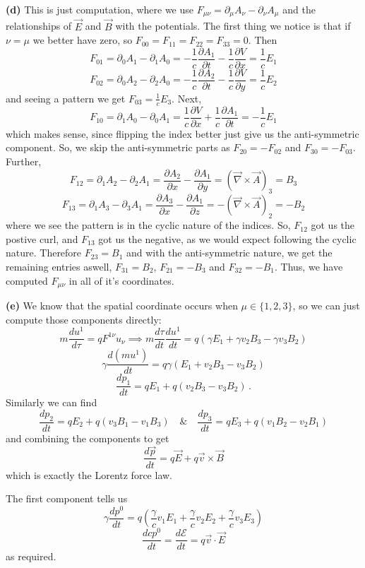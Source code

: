 \documentclass[10pt]{article}
\newcommand{\di}[2][]{\frac{\partial #1}{\partial #2}}
\newcommand{\del}[2][]{\frac{d #1}{d #2}}
\begin{document}
\textbf{(d)} This is just computation, where we use $F_{\mu\nu} =\partial_{\mu}A_{\nu} - \partial_{\nu}A_{\mu}$ and the relationships of $\vec{E}$ and $\vec{B}$ with the potentials. The first thing we notice is that if $\nu=\mu$ we better have zero, so $F_{00} = F_{11} = F_{22} = F_{33} = 0$. Then
\[ F_{01} = \partial_{0}A_{1} - \partial_{1}A_{0} = -\frac{1}{c}\di[A_{1}]{t} - \frac{1}{c}\di[V]{x} = \frac{1}{c}E_{1} \]
\[ F_{02} = \partial_{0}A_{2} - \partial_{2}A_{0} = -\frac{1}{c}\di[A_{2}]{t} - \frac{1}{c}\di[V]{y} = \frac{1}{c}E_{2} \]
and seeing a pattern we get $F_{03} = \frac{1}{c}E_{3}$. Next,
\[ F_{10} = \partial_{1}A_{0} - \partial_{0}A_{1} = \frac{1}{c}\di[V]{x} + \frac{1}{c}\di[A_{1}]{t} = -\frac{1}{c}E_{1}\]
which makes sense, since flipping the index better just give us the anti-symmetric component. So, we skip the anti-symmetric parts as $F_{20} = -F_{02}$ and $F_{30} = -F_{03}$. Further,
\[ F_{12} = \partial_{1}A_{2} - \partial_{2}A_{1} = \di[A_{2}]{x} - \di[A_{1}]{y} = \left(\vec{\nabla}\times \vec{A}\right)_{3} = B_{3}\]
\[ F_{13} = \partial_{1}A_{3} - \partial_{3}A_{1} = \di[A_{3}]{x} - \di[A_{1}]{z} = -\left(\vec{\nabla}\times \vec{A}\right)_{2} = -B_{2} \]
where we see the pattern is in the cyclic nature of the indices. So, $F_{12}$ got us the postive curl, and $F_{13}$ got us the negative, as we would expect following the cyclic nature. Therefore $F_{23} = B_{1}$ and with the anti-symmetric nature, we get the remaining entries aswell, $F_{31} = B_{2}$, $F_{21} = -B_{3}$ and $F_{32} = -B_{1}$. Thus, we have computed $F_{\mu\nu}$ in all of it's coordinates.

\textbf{(e)} We know that the spatial coordinate occurs when $\mu \in \{1,2,3\}$, so we can just compute those components directly:
\[ m\del[u^{1}]{\tau} = qF^{1\nu}u_{\nu} \implies m\del[\tau]{t}\del[u^{1}]{t} = q\left(\gamma E_{1} + \gamma v_{2}B_{3} - \gamma v_{3} B_{2}\right) \]
\[ \gamma\del[(mu^{1})]{t} = q\gamma\left(E_{1} + v_{2}B_{3} - v_{3}B_{2}\right) \]
\[ \del[p_{1}]{t} = qE_{1} + q(v_{2}B_{3} - v_{3}B_{2})\, .\]
Similarly we can find
\[ \del[p_{2}]{t} = qE_{2} + q(v_{3}B_{1} - v_{1}B_{3}) \quad \& \quad \del[p_{3}]{t} = qE_{3} + q(v_{1}B_{2} - v_{2}B_{1}) \]
and combining the components to get
\[ \del[\vec{p}]{t} = q\vec{E} + q\vec{v}\times \vec{B} \]
which is exactly the Lorentz force law.

The first component tells us
\[ \gamma \del[p^{0}]{t} = q\left(\frac{\gamma}{c}v_{1}E_{1} + \frac{\gamma}{c}v_{2}E_{2} + \frac{\gamma}{c}v_{3}E_{3}\right) \]
\[ \del[cp^{0}]{t} = \del[\mathcal{E}]{t} = q\vec{v}\cdot \vec{E} \]
as required.
\end{document}
